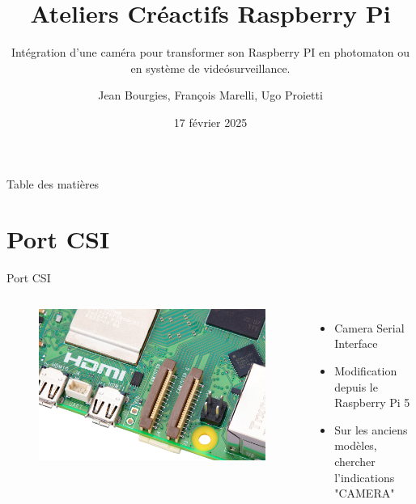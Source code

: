 \documentclass[aspectratio=169,xcolor=dvipsnames]{beamer}
\title{Ateliers Créactifs Raspberry Pi}
\subtitle{Intégration d'une caméra pour transformer son Raspberry PI en photomaton ou en système de videósurveillance.}
\author{Jean Bourgies, François Marelli, Ugo Proietti}
\date{17 février 2025}
\begin{document}
\begin{frame}
    \titlepage
\end{frame}

\begin{frame}{Table des matières}
    \tableofcontents
\end{frame}

\section{Port CSI}

\begin{frame}{Port CSI}
    \begin{columns}[c] %

        \begin{figure}
            \includegraphics[width=1\textwidth]{images/rpi-5-dsi-csi.jpg}
        \end{figure}

        \begin{itemize}
            \item Camera Serial Interface
            \item Modification depuis le Raspberry Pi 5
            \item Sur les anciens modèles, chercher l'indications "CAMERA"
        \end{itemize}

    \end{columns}
\end{frame}
\end{document}
